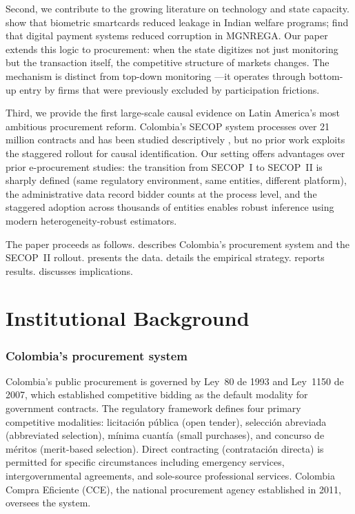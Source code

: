 \documentclass[12pt]{article}
\begin{document}
Second, we contribute to the growing literature on technology and state capacity. \citet{muralidharan2016} show that biometric smartcards reduced leakage in Indian welfare programs; \citet{banerjee2020} find that digital payment systems reduced corruption in MGNREGA. Our paper extends this logic to procurement: when the state digitizes not just monitoring but the transaction itself, the competitive structure of markets changes. The mechanism is distinct from top-down monitoring \citep{olken2007, ferraz2011}---it operates through bottom-up entry by firms that were previously excluded by participation frictions.

Third, we provide the first large-scale causal evidence on Latin America's most ambitious procurement reform. Colombia's SECOP system processes over 21 million contracts and has been studied descriptively \citep{gallego2022}, but no prior work exploits the staggered rollout for causal identification. Our setting offers advantages over prior e-procurement studies: the transition from SECOP~I to SECOP~II is sharply defined (same regulatory environment, same entities, different platform), the administrative data record bidder counts at the process level, and the staggered adoption across thousands of entities enables robust inference using modern heterogeneity-robust estimators.

The paper proceeds as follows.  describes Colombia's procurement system and the SECOP~II rollout.  presents the data.  details the empirical strategy.  reports results.  discusses implications.


\section{Institutional Background}
\label{sec:background}

\subsubsection*{Colombia's procurement system} Colombia's public procurement is governed by Ley~80 de 1993 and Ley~1150 de 2007, which established competitive bidding as the default modality for government contracts. The regulatory framework defines four primary competitive modalities: licitaci\'{o}n p\'{u}blica (open tender), selecci\'{o}n abreviada (abbreviated selection), m\'{i}nima cuant\'{i}a (small purchases), and concurso de m\'{e}ritos (merit-based selection). Direct contracting (contrataci\'{o}n directa) is permitted for specific circumstances including emergency services, intergovernmental agreements, and sole-source professional services. Colombia Compra Eficiente (CCE), the national procurement agency established in 2011, oversees the system.
\end{document}
